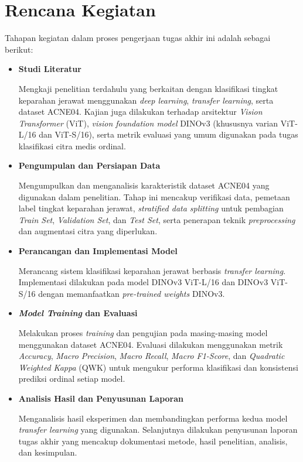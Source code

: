 \section{Rencana Kegiatan}

Tahapan kegiatan dalam proses pengerjaan tugas akhir ini adalah sebagai berikut:

\begin{itemize}

\item \textbf{Studi Literatur}

Mengkaji penelitian terdahulu yang berkaitan dengan klasifikasi tingkat keparahan jerawat menggunakan \textit{deep learning}, \textit{transfer learning}, serta dataset ACNE04. Kajian juga dilakukan terhadap arsitektur \textit{Vision Transformer} (ViT), \textit{vision foundation model} DINOv3 (khususnya varian ViT-L/16 dan ViT-S/16), serta metrik evaluasi yang umum digunakan pada tugas klasifikasi citra medis ordinal.

\item \textbf{Pengumpulan dan Persiapan Data}

Mengumpulkan dan menganalisis karakteristik dataset ACNE04 yang digunakan dalam penelitian. Tahap ini mencakup verifikasi data, pemetaan label tingkat keparahan jerawat, \textit{stratified data splitting} untuk pembagian \textit{Train Set}, \textit{Validation Set}, dan \textit{Test Set}, serta penerapan teknik \textit{preprocessing} dan augmentasi citra yang diperlukan.

\item \textbf{Perancangan dan Implementasi Model}

Merancang sistem klasifikasi keparahan jerawat berbasis \textit{transfer learning}. Implementasi dilakukan pada model DINOv3 ViT-L/16 dan DINOv3 ViT-S/16 dengan memanfaatkan \textit{pre-trained weights} DINOv3.

\item \textbf{\textit{Model Training} dan Evaluasi}

Melakukan proses \textit{training} dan pengujian pada masing-masing model menggunakan dataset ACNE04. Evaluasi dilakukan menggunakan metrik \textit{Accuracy}, \textit{Macro Precision}, \textit{Macro Recall}, \textit{Macro F1-Score}, dan \textit{Quadratic Weighted Kappa} (QWK) untuk mengukur performa klasifikasi dan konsistensi prediksi ordinal setiap model.

\item \textbf{Analisis Hasil dan Penyusunan Laporan}

Menganalisis hasil eksperimen dan membandingkan performa kedua model \textit{transfer learning} yang digunakan. Selanjutnya dilakukan penyusunan laporan tugas akhir yang mencakup dokumentasi metode, hasil penelitian, analisis, dan kesimpulan.

\end{itemize}

